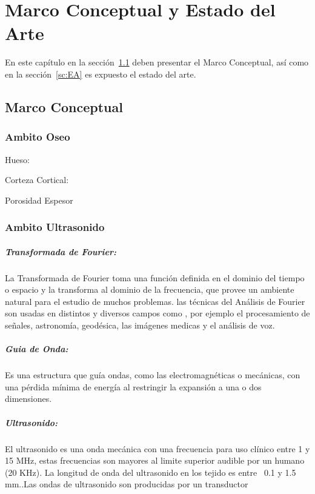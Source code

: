 \chapter{Marco Conceptual y Estado del Arte}

En este capítulo en la sección~\ref{sc:MC} deben presentar el Marco Conceptual, así como en la sección~\ref{sc:EA} es expuesto el estado del arte. 

\section{Marco Conceptual}
\label{sc:MC}

\subsection{Ambito Oseo}

Hueso:

Corteza Cortical:

Porosidad 
Espesor 

\subsection{Ambito Ultrasonido}

\paragraph{Transformada de Fourier:} 
La Transformada de Fourier toma una función definida en el dominio del tiempo o  espacio y la transforma al dominio de la frecuencia, que provee un ambiente natural para el estudio de muchos problemas. las técnicas del Análisis de Fourier son usadas en distintos y diversos campos como , por ejemplo el procesamiento de señales, astronomía, geodésica, las imágenes medicas y el análisis de voz.\cite{EMS}

\paragraph{Guia de Onda:} Es una estructura que guía ondas, como las electromagnéticas o mecánicas, con una pérdida mínima de energía al restringir la expansión a una o dos dimensiones.

\paragraph{Ultrasonido:} El ultrasonido es una onda mecánica con una frecuencia para uso clínico entre 1 y 15 MHz, estas frecuencias son mayores al limite superior audible por un humano (20 KHz). La longitud de onda del ultrasonido en los tejido es entre ~0.1 y 1.5 mm.\cite{IMIP}\cite{AbuZidan2011ClinicalUP}.Las ondas de ultrasonido son producidas por un transductor


